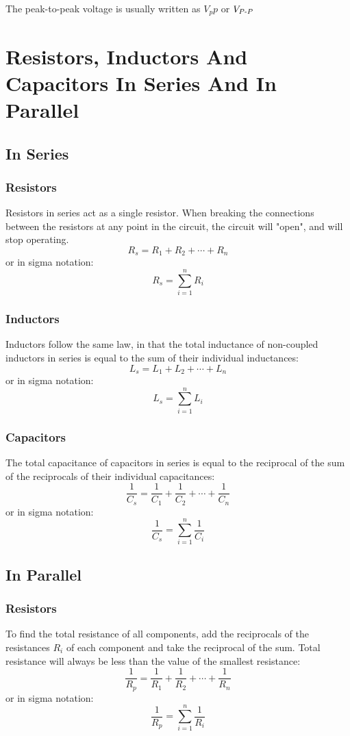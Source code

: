 \documentclass[12pt,a4paper,oneside]{article}
\begin{document}
The peak-to-peak voltage is usually written as \(V_pp\) or \(V_{P\text-P}\)
\section{Resistors, Inductors And Capacitors In Series And In Parallel}
\subsection{In Series}
\subsubsection{Resistors}
Resistors in series act as a single resistor. When breaking the connections between the resistors at any point in the circuit, the circuit will "open", and will stop operating.
\[
	R_s = R_1 + R_2 + \cdots + R_n
\]
or in sigma notation:
\[
	R_s = \sum_{i = 1}^n R_i
\]
\subsubsection{Inductors}
Inductors follow the same law, in that the total inductance of non-coupled inductors in series is equal to the sum of their individual inductances:
\[
	L_s = L_1 + L_2 + \cdots + L_n
\]
or in sigma notation:
\[
	L_s =  \sum_{i = 1}^n L_i
\]
\subsubsection{Capacitors}
The total capacitance of capacitors in series is equal to the reciprocal of the sum of the reciprocals of their individual capacitances:
\[
	\frac{1}{C_s} = \frac{1}{C_1} + \frac{1}{C_2} + \cdots + \frac{1}{C_n}
\]
or in sigma notation:
\[
	\frac{1}{C_s} = \sum_{i = 1}^n \frac{1}{C_i}
\]
\subsection{In Parallel}
\subsubsection{Resistors}
To find the total resistance of all components, add the reciprocals of the resistances \(R_i\) of each component and take the reciprocal of the sum. Total resistance will always be less than the value of the smallest resistance:
\[
	\frac{1}{R_p} = \frac{1}{R_1} + \frac{1}{R_2} + \cdots + \frac{1}{R_n}
\]
or in sigma notation:
\[
	\frac{1}{R_p} = \sum_{i = 1}^n \frac{1}{R_i}
\]
\end{document}
